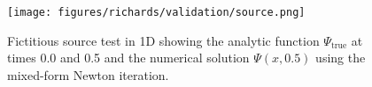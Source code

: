 \begin{figure}[!ht]
\begin{center}
\texttt{[image: figures/richards/validation/source.png]}
\end{center}
\caption{Fictitious source test in 1D showing the analytic function $\Psi_{\text{true}}$ at times 0.0 and 0.5 and the numerical solution $\Psi(x,0.5)$ using the mixed-form Newton iteration.}
\label{fig:richards-validation-source}
\end{figure}
